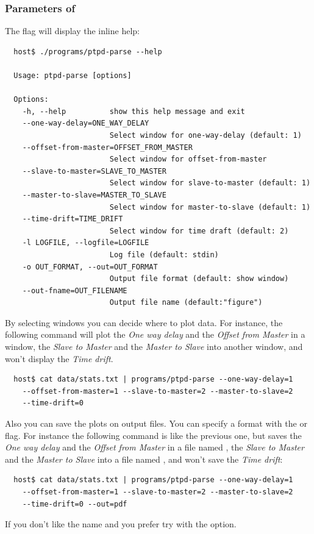         \subsubsection{Parameters of }

            The  flag will display the inline help:
\begin{lstlisting}
  host$ ./programs/ptpd-parse --help

  Usage: ptpd-parse [options]

  Options:
    -h, --help          show this help message and exit
    --one-way-delay=ONE_WAY_DELAY
                        Select window for one-way-delay (default: 1)
    --offset-from-master=OFFSET_FROM_MASTER
                        Select window for offset-from-master
    --slave-to-master=SLAVE_TO_MASTER
                        Select window for slave-to-master (default: 1)
    --master-to-slave=MASTER_TO_SLAVE
                        Select window for master-to-slave (default: 1)
    --time-drift=TIME_DRIFT
                        Select window for time draft (default: 2)
    -l LOGFILE, --logfile=LOGFILE
                        Log file (default: stdin)
    -o OUT_FORMAT, --out=OUT_FORMAT
                        Output file format (default: show window)
    --out-fname=OUT_FILENAME
                        Output file name (default:"figure")
\end{lstlisting}

            By selecting windows you can decide where to plot data. For
            instance, the following command will plot the \emph{One way
            delay} and the \emph{Offset from Master} in a window,
            the \emph{Slave to Master} and the \emph{Master to Slave} into
            another window, and won't display the \emph{Time drift}.
\begin{lstlisting}
  host$ cat data/stats.txt | programs/ptpd-parse --one-way-delay=1
    --offset-from-master=1 --slave-to-master=2 --master-to-slave=2
    --time-drift=0
\end{lstlisting}

            Also you can save the plots on output files. You can specify a
            format with the  or  flag. For instance
            the following command is like the previous one, but saves
            the \emph{One way delay} and the \emph{Offset from Master} in
            a file named , the \emph{Slave to
            Master} and the \emph{Master to Slave} into a file named
            , and won't save the \emph{Time
            drift}:
\begin{lstlisting}
  host$ cat data/stats.txt | programs/ptpd-parse --one-way-delay=1
    --offset-from-master=1 --slave-to-master=2 --master-to-slave=2
    --time-drift=0 --out=pdf
\end{lstlisting}
            If you don't like the name  and you
            prefer  try with the
             option.

